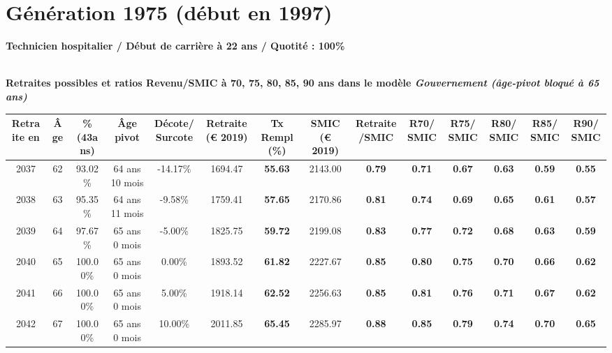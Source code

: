 \section{Génération 1975 (début en 1997)\label{TechHosp_100_1975_22_0}} 
 
{\bf \noindent Technicien hospitalier / Début de carrière à 22 ans / Quotité : 100\%}  ~ 

 ~\\{\bf \noindent Retraites possibles et ratios Revenu/SMIC à 70, 75, 80, 85, 90 ans dans le modèle \emph{Gouvernement (âge-pivot bloqué à 65 ans)}}  
 
\begin{adjustbox}{max width=\textwidth} 
\begin{tabular}[htb]{|c|c||c|c|c||c|c||c|c||c|c|c|c|c|} 
\hline 
 Retraite en &  Âge &  \%(43ans) &  Âge pivot &  Décote/Surcote &  Retraite (\euro{} 2019) &  Tx Rempl(\%) &  SMIC (\euro{} 2019) &  Retraite/SMIC &  R70/SMIC &  R75/SMIC &  R80/SMIC &  R85/SMIC &  R90/SMIC \\ 
\hline \hline 
 2037 &  62 &  93.02\% &  64 ans 10 mois &  -14.17\% &  1694.47 &  {\bf 55.63} &  2143.00 &  {\bf {\color{red} 0.79}} &  {\bf {\color{red} 0.71}} &  {\bf {\color{red} 0.67}} &  {\bf {\color{red} 0.63}} &  {\bf {\color{red} 0.59}} &  {\bf {\color{red} 0.55}} \\ 
\hline 
 2038 &  63 &  95.35\% &  64 ans 11 mois &  -9.58\% &  1759.41 &  {\bf 57.65} &  2170.86 &  {\bf {\color{red} 0.81}} &  {\bf {\color{red} 0.74}} &  {\bf {\color{red} 0.69}} &  {\bf {\color{red} 0.65}} &  {\bf {\color{red} 0.61}} &  {\bf {\color{red} 0.57}} \\ 
\hline 
 2039 &  64 &  97.67\% &  65 ans 0 mois &  -5.00\% &  1825.75 &  {\bf 59.72} &  2199.08 &  {\bf {\color{red} 0.83}} &  {\bf {\color{red} 0.77}} &  {\bf {\color{red} 0.72}} &  {\bf {\color{red} 0.68}} &  {\bf {\color{red} 0.63}} &  {\bf {\color{red} 0.59}} \\ 
\hline 
 2040 &  65 &  100.00\% &  65 ans 0 mois &  0.00\% &  1893.52 &  {\bf 61.82} &  2227.67 &  {\bf {\color{red} 0.85}} &  {\bf {\color{red} 0.80}} &  {\bf {\color{red} 0.75}} &  {\bf {\color{red} 0.70}} &  {\bf {\color{red} 0.66}} &  {\bf {\color{red} 0.62}} \\ 
\hline 
 2041 &  66 &  100.00\% &  65 ans 0 mois &  5.00\% &  1918.14 &  {\bf 62.52} &  2256.63 &  {\bf {\color{red} 0.85}} &  {\bf {\color{red} 0.81}} &  {\bf {\color{red} 0.76}} &  {\bf {\color{red} 0.71}} &  {\bf {\color{red} 0.67}} &  {\bf {\color{red} 0.62}} \\ 
\hline 
 2042 &  67 &  100.00\% &  65 ans 0 mois &  10.00\% &  2011.85 &  {\bf 65.45} &  2285.97 &  {\bf {\color{red} 0.88}} &  {\bf {\color{red} 0.85}} &  {\bf {\color{red} 0.79}} &  {\bf {\color{red} 0.74}} &  {\bf {\color{red} 0.70}} &  {\bf {\color{red} 0.65}} \\ 
\hline 
\hline 
\end{tabular} 
\end{adjustbox} 
 
